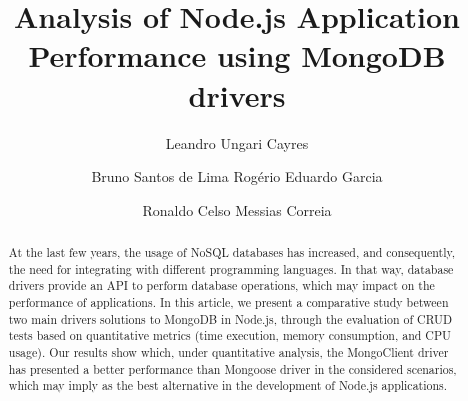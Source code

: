 \documentclass{svproc}
\begin{document}
\mainmatter              %
%
\title{Analysis of Node.js Application Performance using MongoDB drivers}
%
%
\author{Leandro Ungari Cayres \and Bruno Santos de Lima Rogério Eduardo Garcia \and Ronaldo Celso Messias Correia}
%
%
%

\maketitle %

\begin{abstract}
At the last few years, the usage of NoSQL databases has increased, and consequently, the need for integrating with different programming languages. In that way, database drivers provide an API to perform database operations, which may impact on the performance of applications. In this article, we present a comparative study between two main drivers solutions to MongoDB in Node.js, through the evaluation of CRUD tests based on quantitative metrics (time execution, memory consumption, and CPU usage). Our results show which, under quantitative analysis, the MongoClient driver has presented a better performance than Mongoose driver in the considered scenarios, which may imply as the best alternative in the development of Node.js applications.
\end{abstract}
%
\end{document}
